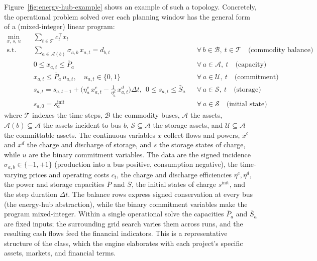 \newpage
Figure~\ref{fig:energy-hub-example} shows an example of such a topology.
Concretely, the operational problem solved over each planning window has the
general form of a (mixed-integer) linear program:
\begin{align}
  \min_{x,\,s,\,u}\quad & \sum_{t\in\mathcal{T}} c_t^{\top} x_t \\
  \text{s.t.}\quad
  & \sum_{a\in\mathcal{A}(b)} \sigma_{a,b}\, x_{a,t} = d_{b,t}
    && \forall\, b\in\mathcal{B},\ t\in\mathcal{T} \quad\text{(commodity balance)} \\
  & 0 \le x_{a,t} \le \bar{P}_a
    && \forall\, a\in\mathcal{A},\ t \quad\text{(capacity)} \\
  & x_{a,t} \le \bar{P}_a\, u_{a,t},\quad u_{a,t}\in\{0,1\}
    && \forall\, a\in\mathcal{U},\ t \quad\text{(commitment)} \\
  & s_{a,t} = s_{a,t-1} + \Big(\eta^{c}_a\, x^{c}_{a,t} - \tfrac{1}{\eta^{d}_a}\, x^{d}_{a,t}\Big)\Delta t,\ \ 0\le s_{a,t}\le \bar{S}_a
    && \forall\, a\in\mathcal{S},\ t \quad\text{(storage)} \\
  & s_{a,0} = s^{\mathrm{init}}_a
    && \forall\, a\in\mathcal{S} \quad\text{(initial state)}
\end{align}
where $\mathcal{T}$ indexes the time steps, $\mathcal{B}$ the commodity buses,
$\mathcal{A}$ the assets, $\mathcal{A}(b)\subseteq\mathcal{A}$ the assets incident to
bus $b$, $\mathcal{S}\subseteq\mathcal{A}$ the storage assets, and
$\mathcal{U}\subseteq\mathcal{A}$ the committable assets. The continuous variables
$x$ collect flows and powers, $x^{c}$ and $x^{d}$ the charge and discharge of
storage, and $s$ the storage states of charge, while $u$ are the binary commitment
variables. The data are the signed incidence $\sigma_{a,b}\in\{-1,+1\}$ (production
into a bus positive, consumption negative), the time-varying prices and operating
costs $c_t$, the charge and discharge efficiencies $\eta^{c},\eta^{d}$, the power and
storage capacities $\bar{P}$ and $\bar{S}$, the initial states of charge
$s^{\mathrm{init}}$, and the step duration $\Delta t$. The balance rows express
signed conservation at every bus (the energy-hub abstraction), while the binary
commitment variables make the program mixed-integer. Within a single operational
solve the capacities $\bar{P}_a$ and $\bar{S}_a$ are fixed inputs; the surrounding
grid search varies them across runs, and the resulting cash flows feed the financial
indicators. This is a representative structure of the class, which the engine
elaborates with each project's specific assets, markets, and financial terms.

